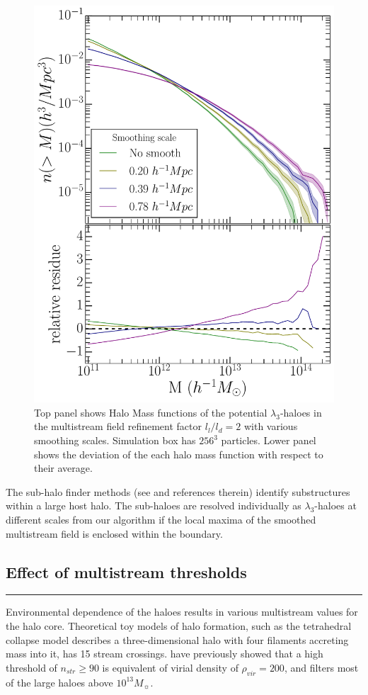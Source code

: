 \documentclass[fleqn,usenatbib,useAMS]{mnras}
\newcommand\hl{\bgroup\markoverwith
  {\textcolor{yellow}{\rule[-.5ex]{2pt}{2.5ex}}}\ULon}
\newcommand\ghl{\bgroup\markoverwith
  {\textcolor{green}{\rule[-.5ex]{2pt}{2.5ex}}}\ULon}
\begin{document}
{\begin{figure}
\begin{minipage}[t]{.99\linewidth}
 \centering\includegraphics[width=8.cm]{fig6.pdf} 
\end{minipage}\hfill
\caption{Top panel shows Halo Mass functions of the potential $\lambda_3$-haloes in the multistream field refinement factor $l_l/l_d = 2$ with various smoothing scales. Simulation box has $256^3$ particles. Lower panel shows the deviation of the each halo mass function with respect to their average.}
\label{fig:hmfSmooth}
\end{figure}

The sub-halo finder methods (see \citealt{Onions2012} and references therein) identify substructures within a large host halo. The sub-haloes are resolved individually as $\lambda_3$-haloes at different scales from our algorithm if the local maxima of the smoothed multistream field is enclosed within the boundary.  




\subsection{Effect of multistream thresholds}
\label{sub:multiThresholds}

\hl{New subsection}

Environmental dependence of the haloes results in various multistream values for the halo core. Theoretical toy models of halo formation, such as the tetrahedral collapse model \cite{Neyrinck2016} describes a three-dimensional halo with four filaments accreting mass into it, has 15 stream crossings. %
\cite{Ramachandra2015} have previously showed that a high threshold of $n_{str} \geq 90$ is equivalent of virial density of $\rho_{vir} = 200$, and filters most of the large haloes above $10^{13} M_{\sun}$. 

}
\end{document}
